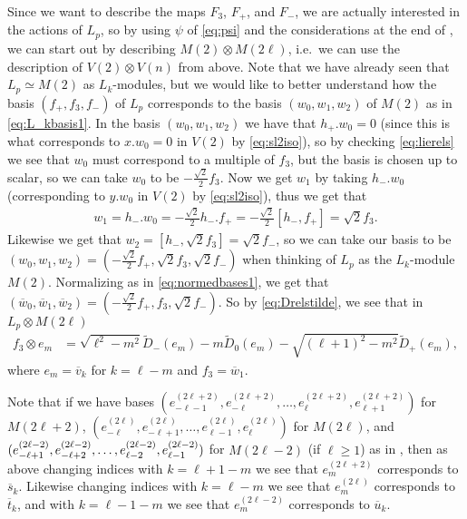 Since we want to describe the maps $F_3$, $F_+$, and $F_-$, we are actually interested in the actions of $L_p$, so by using $\psi$ of \cref{eq:psi} and the considerations at the end of , we can start out by describing $M(2)\otimes M(2\ell)$, i.e.\ we can use the description of $V(2)\otimes V(n)$ from above. Note that we have already seen that $L_p\simeq M(2)$ as $L_k$-modules, but we would like to better understand how the basis $(f_+,f_3,f_-)$ of $L_p$ corresponds to the basis $(w_0,w_1,w_2)$ of $M(2)$ as in \cref{eq:L_kbasis1}. In the basis $(w_0,w_1,w_2)$ we have that $h_+ . w_0 = 0$ (since this is what corresponds to $x.w_0=0$ in $V(2)$ by \cref{eq:sl2iso}), so by checking \cref{eq:lierels} we see that $w_0$ must correspond to a multiple of $f_3$, but the basis is chosen up to scalar, so we can take $w_0$ to be $-\tfrac{\sqrt{2}}{2}f_3$. Now we get $w_1$ by taking $h_- . w_0$ (corresponding to $y.w_0$ in $V(2)$ by \cref{eq:sl2iso}), thus we get that
\begin{align*}
  w_1 = h_-.w_0 = -\tfrac{\sqrt{2}}{2}h_- . f_+ = -\tfrac{\sqrt{2}}{2}[h_-,f_+] = \sqrt{2}f_3.
\end{align*}
Likewise we get that $w_2=[h_-,\sqrt{2}f_3]=\sqrt{2}f_-$, so we can take our basis to be $(w_0,w_1,w_2)=(-\tfrac{\sqrt{2}}{2}f_+,\sqrt{2}f_3,\sqrt{2}f_-)$ when thinking of $L_p$ as the $L_k$-module $M(2)$. Normalizing as in \cref{eq:normedbases1}, we get that $(\overline w_0,\overline w_1,\overline w_2)=(-\tfrac{\sqrt{2}}{2}f_+,f_3,\sqrt{2}f_-)$. So by \cref{eq:Drelstilde}, we see that in $L_p\otimes M(2\ell)$
\begin{align*}
  f_3 \otimes e_m &= \sqrt{\ell^2-m^2}\widetilde D_-(e_m) - m\widetilde D_0(e_m) - \sqrt{(\ell+1)^2-m^2}\widetilde D_+(e_m),
\end{align*}
where $e_m=\overline v_k$ for $k=\ell-m$ and $f_3 = \overline w_1$.
\begin{remark}\label{rem:baseswithindexchange}
  Note that if we have bases $(e_{-\ell-1}^{(2\ell+2)},e_{-\ell}^{(2\ell+2)},\dotsc,e_{\ell}^{(2\ell+2)},e_{\ell+1}^{(2\ell+2)})$ for $M(2\ell+2)$, $(e_{-\ell}^{(2\ell)},e_{-\ell+1}^{(2\ell)},\dotsc,e_{\ell-1}^{(2\ell)},e_{\ell}^{(2\ell)})$ for $M(2\ell)$, and $(e_{-\ell+1}^{(2\ell-2)},e_{-\ell+2}^{(2\ell-2)},\dotsc,\\ e_{\ell-2}^{(2\ell-2)},e_{\ell-1}^{(2\ell-2)})$ for $M(2\ell-2)$ (if $\ell\geq 1$) as in , then as above changing indices with $k=\ell+1-m$ we see that $e_m^{(2\ell+2)}$ corresponds to $\overline s_k$. Likewise changing indices with $k=\ell-m$ we see that $e_m^{(2\ell)}$ corresponds to $\overline t_k$, and with $k=\ell-1-m$ we see that $e_m^{(2\ell-2)}$ corresponds to $\overline u_k$. 
\end{remark}

